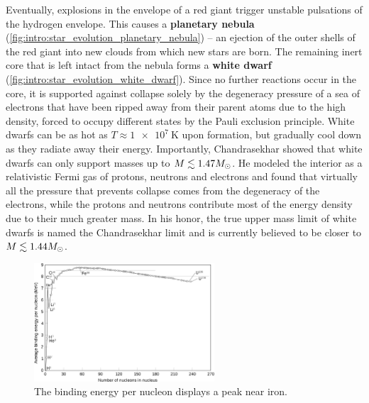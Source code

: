 Eventually, explosions in the envelope of a red giant trigger unstable pulsations of the hydrogen envelope.
This causes a \textbf{planetary nebula} (\cref{fig:intro:star_evolution_planetary_nebula}) -- an ejection of the outer shells of the red giant into new clouds from which new stars are born.
The remaining inert core that is left intact from the nebula forms a \textbf{white dwarf} (\cref{fig:intro:star_evolution_white_dwarf}).
Since no further reactions occur in the core, it is supported against collapse solely by the degeneracy pressure of a sea of electrons that have been ripped away from their parent atoms due to the high density, forced to occupy different states by the Pauli exclusion principle.
White dwarfs can be as hot as $T \approx \SI{1e7}{\kelvin}$ upon formation, but gradually cool down as they radiate away their energy.
Importantly, Chandrasekhar showed that white dwarfs can only support masses up to $M \lesssim 1.47 M_\odot$. \cite{ref:chandrasekhar_limit_nonideal}
He modeled the interior as a relativistic Fermi gas of protons, neutrons and electrons and found that virtually all the pressure that prevents collapse comes from the degeneracy of the electrons, while the protons and neutrons contribute most of the energy density due to their much greater mass.
In his honor, the true upper mass limit of white dwarfs is named the Chandrasekhar limit and is currently believed to be closer to $M \lesssim 1.44 M_\odot$. \cite{ref:glendenning}

\begin{figure}
\centering
%
\includegraphics[width=0.6\textwidth]{figures/binding_energy_curve.png}
\caption{\label{fig:intro:iron_peak}%
	The binding energy per nucleon displays a peak near iron.
}
\end{figure}


